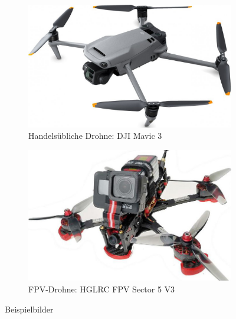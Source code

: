         \vspace{1.2cm}
        \begin{figure}[h]
            \centering
            \begin{subfigure}[b]{0.45\textwidth}
                \centering
                \includegraphics[width=\textwidth]{Img/Bild_DJIMavic3.jpg}
                \caption{Handelsübliche Drohne: DJI Mavic 3}
                \label{handelsueblchedrohne}
            \end{subfigure}
            \hfill
            \begin{subfigure}[b]{0.45\textwidth}
                \centering
                \includegraphics[width=\textwidth]{Img/Bild_FPV.jpg}
                \caption{FPV-Drohne: HGLRC FPV Sector 5 V3}
                \label{fpvdrohne}
            \end{subfigure}
               \caption{Beispielbilder}
               \label{bild_beispielbilder}
       \end{figure}


